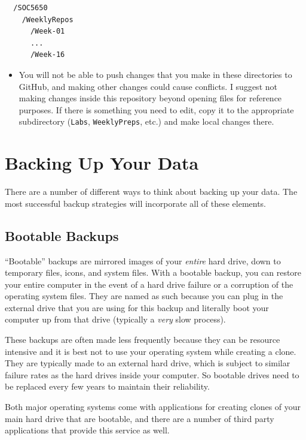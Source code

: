\documentclass[]{book}
\newenvironment{rmdblock}[1]
  {\begin{shaded*}
  \begin{itemize}
  \renewcommand{\labelitemi}{
    \raisebox{-.7\height}[0pt][0pt]{
      {\setkeys{Gin}{width=3em,keepaspectratio}\texttt{[image: images/\#1]}}
    }
  }
  \item
  }
  {
  \end{itemize}
  \end{shaded*}
  }
\newenvironment{rmdwarning}
  {\begin{rmdblock}{warning}}
  {\end{rmdblock}}
\theoremstyle{definition}
\theoremstyle{definition}
\theoremstyle{definition}
\theoremstyle{remark}
\begin{document}
\begin{verbatim}
  /SOC5650
    /WeeklyRepos
      /Week-01
      ...
      /Week-16
\end{verbatim}

\begin{rmdwarning}
You will not be able to push changes that you make in these directories
to GitHub, and making other changes could cause conflicts. I suggest not
making changes inside this repository beyond opening files for reference
purposes. If there is something you need to edit, copy it to the
appropriate subdirectory (\texttt{Labs}, \texttt{WeeklyPreps}, etc.) and
make local changes there.
\end{rmdwarning}

\section{Backing Up Your Data}\label{backing-up-your-data}

There are a number of different ways to think about backing up your
data. The most successful backup strategies will incorporate all of
these elements.

\subsection{Bootable Backups}\label{bootable-backups}

``Bootable'' backups are mirrored images of your \emph{entire} hard
drive, down to temporary files, icons, and system files. With a bootable
backup, you can restore your entire computer in the event of a hard
drive failure or a corruption of the operating system files. They are
named as such because you can plug in the external drive that you are
using for this backup and literally boot your computer up from that
drive (typically a \emph{very} slow process).

These backups are often made less frequently because they can be
resource intensive and it is best not to use your operating system while
creating a clone. They are typically made to an external hard drive,
which is subject to similar failure rates as the hard drives inside your
computer. So bootable drives need to be replaced every few years to
maintain their reliability.

Both major operating systems come with applications for creating clones
of your main hard drive that are bootable, and there are a number of
third party applications that provide this service as well.
\end{document}
